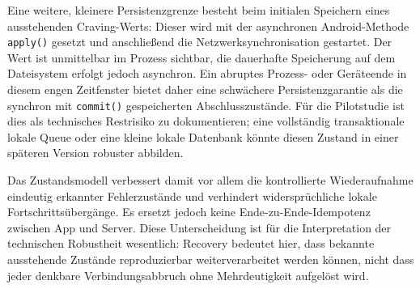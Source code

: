 \begin{neu}
Eine weitere, kleinere Persistenzgrenze besteht beim initialen Speichern eines ausstehenden Craving-Werts: Dieser wird mit der asynchronen Android-Methode \texttt{apply()} gesetzt und anschließend die Netzwerksynchronisation gestartet. Der Wert ist unmittelbar im Prozess sichtbar, die dauerhafte Speicherung auf dem Dateisystem erfolgt jedoch asynchron. Ein abruptes Prozess- oder Geräteende in diesem engen Zeitfenster bietet daher eine schwächere Persistenzgarantie als die synchron mit \texttt{commit()} gespeicherten Abschlusszustände. Für die Pilotstudie ist dies als technisches Restrisiko zu dokumentieren; eine vollständig transaktionale lokale Queue oder eine kleine lokale Datenbank könnte diesen Zustand in einer späteren Version robuster abbilden.

Das Zustandsmodell verbessert damit vor allem die kontrollierte Wiederaufnahme eindeutig erkannter Fehlerzustände und verhindert widersprüchliche lokale Fortschrittsübergänge. Es ersetzt jedoch keine Ende-zu-Ende-Idempotenz zwischen App und Server. Diese Unterscheidung ist für die Interpretation der technischen Robustheit wesentlich: Recovery bedeutet hier, dass bekannte ausstehende Zustände reproduzierbar weiterverarbeitet werden können, nicht dass jeder denkbare Verbindungsabbruch ohne Mehrdeutigkeit aufgelöst wird.
\end{neu}
